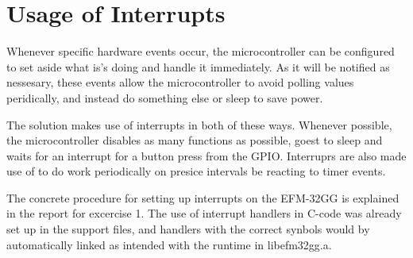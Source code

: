 \section{Usage of Interrupts}
Whenever specific hardware events occur, the microcontroller can be configured to set aside what is's doing and handle it immediately.
As it will be notified as nessesary, these events allow the microcontroller to avoid polling values peridically, and instead do something else or sleep to save power.

The solution makes use of interrupts in both of these ways.
Whenever possible, the microcontroller disables as many functions as possible, goest to sleep and waits for an interrupt for a button press from the GPIO.
Interruprs are also made use of to do work periodically on presice intervals be reacting to timer events.

The concrete procedure for setting up interrupts on the EFM-32GG is explained in the report for excercise 1\cite{ex1-report}.
The use of interrupt handlers in C-code was already set up in the support files, and handlers with the correct synbols would by automatically linked as intended with the runtime in libefm32gg.a.
